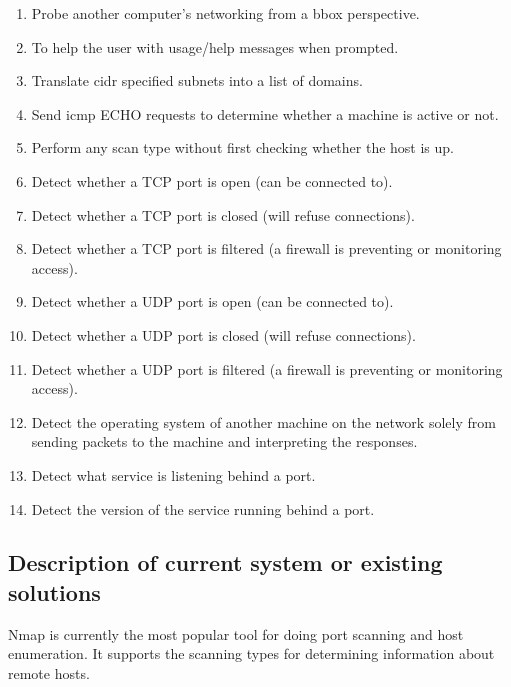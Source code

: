 \documentclass[titlepage]{article}
\let\Oldsubsection\subsection{}
\renewcommand{\subsection}{\FloatBarrier\Oldsubsection}
\begin{document}
\begin{enumerate}

  \item{%
    Probe another computer's networking from a \gls{bbox} perspective.
  }\label{blackbox}
  \item{%
    To help the user with usage/help messages when prompted.  
  }\label{usage}
  \item{%
    Translate \gls{cidr} specified subnets into a list of domains.
  }\label{cidr}
  \item{%
    Send \gls{icmp} ECHO requests to determine whether a machine is active
    or not.
  }\label{ping}
  \item{%
    Perform any scan type without first checking whether the host is up.
  }\label{nocheck}
  \item{%
    Detect whether a TCP port is open (can be connected to).
  }\label{tcpopen}
  \item{%
    Detect whether a TCP port is closed (will refuse connections).
  }\label{tcpclosed}
  \item{%
    Detect whether a TCP port is filtered (a firewall is
    preventing or monitoring access).
  }\label{tcpfiltered}
  \item{%
    Detect whether a UDP port is open (can be connected to).
  }\label{udpopen}
  \item{%
    Detect whether a UDP port is closed (will refuse connections).
  }\label{udpclosed}
  \item{%
    Detect whether a UDP port is filtered (a firewall is
    preventing or monitoring access).
  }\label{udpfiltered}
  \item{%
    Detect the operating system of another machine on the network
    solely from sending packets to the machine and interpreting the responses.
  }\label{osdetect}
  \item{%
    Detect what service is listening behind a port.
  }\label{servicedetect}
  \item{%
    Detect the version of the service running behind a port.
  }\label{versiondetect}

\end{enumerate}

\subsection{Description of current system or existing solutions}

Nmap is currently the most popular tool for doing \gls{port} scanning and host enumeration.
It supports the scanning types for determining information about remote hosts.
\end{document}
